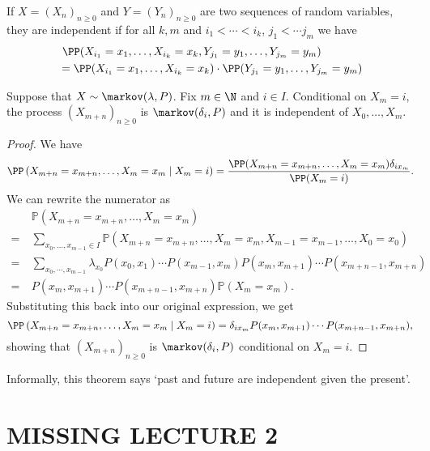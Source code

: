 \documentclass[a4paper]{scrartcl}
\begin{document}
If $X = (X_n)_{n \geq 0}$ and $Y = (Y_n)_{n \geq 0}$ are two sequences of random variables, they are independent if for all $k, m$ and $i_1 < \cdots < i_k$, $j_1 < \cdots j_m$ we have
\begin{align*}
	&\ \PP(X_{i_1} = x_1, \dots, X_{i_k} = x_k, Y_{j_1} = y_1, \dots, Y_{j_m} = y_m) \\
	&= \PP(X_{i_1} = x_1, \dots, X_{i_k} = x_k) \cdot \PP(Y_{j_1} = y_1, \dots, Y_{j_m} = y_m) 
\end{align*}

\begin{theorem}
	Suppose that $X \sim \markov(\lambda, P)$. Fix $m \in \N$ and $i \in I$. Conditional on $X_m = i$, the process $(X_{m + n})_{n \geq 0}$ is $\markov(\delta_i, P)$ and it is independent of $X_0, \dots, X_m$.
\end{theorem}

\begin{proof}
	We have
	$$
		\PP\left(X_{m+n}=x_{m+n}, \ldots, X_{m}= x_{m} \mid X_{m}=i\right) = \frac{\PP(X_{m + n} = x_{m + n}, \dots, X_{m} = x_m) \delta_{i x_m}}{\PP(X_m = i)}.
		$$
	We can rewrite the numerator as
	\begin{align*}
	&\mathbb{P}\left(X_{m+n}=x_{m+n}, \ldots, X_{m}=x_{m}\right) \\
=\  &\sum_{x_{0}, \ldots, x_{m-1} \in I} \mathbb{P}\left(X_{m+n}=x_{m+n}, \ldots, X_{m}=x_{m}, X_{m-1}=x_{m-1}, \ldots, X_{0} =x_{0}\right) \\
=\ &\sum_{x_{0}, \cdots, x_{m-1}} \lambda_{x_{0}} P\left(x_{0}, x_{1}\right) \cdots P(x_{m-1}, x_{m}) P(x_{m}, x_{m+1}) \cdots P(x_{m+n-1}, x_{m+n})
 \\
=\ &P\left(x_{m}, x_{m+1}\right) \cdots P\left(x_{m+n-1}, x_{m+n}\right) \mathbb{P}\left(X_{m}=x_{m}\right).
	\end{align*}
	Substituting this back into our original expression, we get 
	$$
	\PP\left(X_{m+n}=x_{m+n}, \ldots, X_{m}= x_{m} \mid X_{m}=i\right) = \delta_{i x_m} P(x_m, x_{m + 1}) \cdots P(x_{m + n - 1}, x_{m + n}),
	$$
	showing that $(X_{m + n})_{n \geq 0}$ is $\markov(\delta_i, P)$ conditional on $X_m = i$.
\end{proof}

\begin{remark}
	Informally, this theorem says `past and future are independent given the present'.
\end{remark}

\section{MISSING LECTURE 2}
\end{document}
